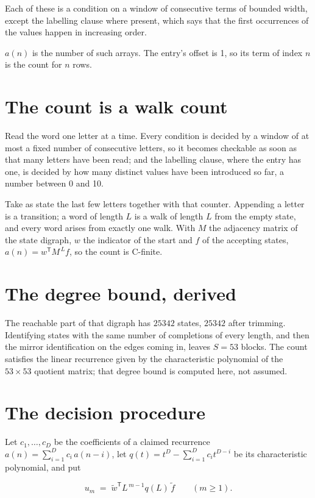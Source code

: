 \documentclass[11pt]{article}
\theoremstyle{definition}
\begin{document}
Each of these is a condition on a window of consecutive terms of bounded width, except the labelling clause where present, which says that the first occurrences of the values happen in increasing order.

$a(n)$ is the number of such arrays. The entry's offset is 1, so its term of index $n$ is the count for $n$ rows.

\section{The count is a walk count}

Read the word one letter at a time. Every condition is decided by a window of at most a fixed number of consecutive letters, so it becomes checkable as soon as that many letters have been read; and the labelling clause, where the entry has one, is decided by how many distinct values have been introduced so far, a number between $0$ and 10.

Take as state the last few letters together with that counter. Appending a letter is a transition; a word of length $L$ is a walk of length $L$ from the empty state, and every word arises from exactly one walk. With $M$ the adjacency matrix of the state digraph, $w$ the indicator of the start and $f$ of the accepting states, $a(n) = w^{\mathsf T}M^{\,L}f$, so the count is C-finite.

\section{The degree bound, derived}

The reachable part of that digraph has $25342$ states, $25342$ after trimming. Identifying states with the same number of completions of every length, and then the mirror identification on the edges coming in, leaves $S = 53$ blocks. The count satisfies the linear recurrence given by the characteristic polynomial of the $53\times53$ quotient matrix; that degree bound is computed here, not assumed.

\section{The decision procedure}

Let $c_1,\dots,c_D$ be the coefficients of a claimed recurrence $a(n) = \sum_{i=1}^{D} c_i\,a(n-i)$, let $q(t) = t^{D} - \sum_{i=1}^{D} c_i t^{D-i}$ be its characteristic polynomial, and put

\[u_m \;=\; \tilde w^{\mathsf T} L^{\,m-1} q(L)\,\tilde f \qquad (m \ge 1).\]
\end{document}
